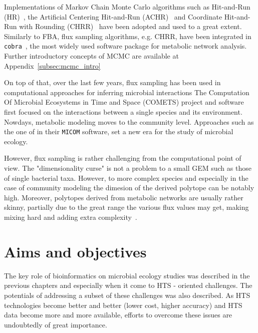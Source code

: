       Implementations of Markov Chain Monte Carlo algorithms such as 
      Hit-and-Run (HR)~\cite{smith84},  
      the Artificial Centering Hit-and-Run
      (ACHR)~\cite{kaufman1998direction} 
      and Coordinate Hit-and-Run with Rounding
      (CHRR)~\cite{haraldsdottir2017chrr}
      have been adopted and used to a great extent. 
      Similarly to FBA, flux sampling algorithms, e.g. CHRR, have been integrated in \texttt{cobra}~\cite{heirendt2019creation},
      the most widely used 
      software package for metabolic network analysis.
      Further introductory concepts of MCMC are available at Appendix~\ref{subsec:mcmc_intro}

      On top of that, over the last few years, flux sampling has been 
      used in computational approaches for inferring microbial interactions 
      The Computation Of Microbial Ecosystems in Time and Space (COMETS) project and software~\cite{dukovski2021metabolic}
      first focused on the interactions between a single species and its environment. 
      Nowdays, metabolic modeling moves to the community level. 
      Approaches such as the one of \citeauthor{diener2020micom} in their \texttt{MICOM}
      software, set a new era for the study of microbial ecology. 
      
      
      However, flux sampling is rather challenging from the computational point of view. 
      The "dimensionality curse" is not a problem to a small GEM such as those of single bacterial taxa.
      However, to more complex species and especially in the case of community modeling 
      the dimesion of the derived polytope can be notably high. 
      Moreover, polytopes derived from metabolic networks are usually rather skinny,
      partially due to the great range the various flux values may get, 
      making mixing hard and 
      adding extra complexity~\cite{Haraldsdottir17,schellenberger2009use}. 


      
\section{Aims and objectives}

   The key role of bioinformatics on microbial ecology studies
   was described in the previous chapters and especially 
   when it come to HTS - oriented challenges. 
   The potentials of addressing a subset of these challenges was also 
   described. 
   As HTS technologies become better and better 
   (lower cost, higher accuracy)
   and HTS data become more and more available, 
   efforts to overcome these issues 
   are undoubtedly of great importance. 


